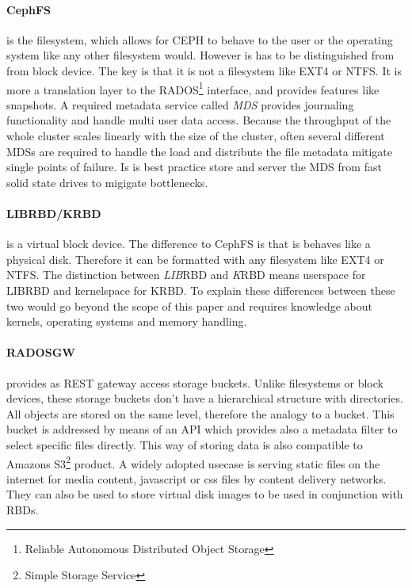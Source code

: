 \documentclass[titlepage, a4paper, 11pt]{scrartcl}
\begin{document}
                \paragraph{CephFS} is the filesystem, which allows for CEPH to behave to the user or the operating system like any other
                filesystem would. However is has to be distinguished from from block device. 
                The key is that it is not a filesystem like EXT4 or NTFS. It is more a translation layer to the
                RADOS\footnote{Reliable Autonomous Distributed Object Storage} interface, and provides features like snapshots. A required metadata service called \textit{MDS} provides journaling functionality and handle
                multi user data access. Because the throughput of the whole cluster scales linearly with the size of the cluster,
                often several different MDSs are required to handle the load and distribute the file metadata mitigate
                single points of failure. Is is best practice store and server the MDS from fast solid state drives to migigate bottlenecks.

                \paragraph{LIBRBD/KRBD} is a virtual block device. The difference to CephFS is that is behaves like a physical disk.
                Therefore it can be formatted with any filesystem like EXT4 or NTFS. The distinction between \textit{LIB}RBD and \textit{K}RBD
                means userspace for LIBRBD and kernelspace for KRBD. To explain these differences between these two would go beyond the 
                scope of this paper and requires knowledge about kernels, operating systems and memory handling. 

                \paragraph{RADOSGW} provides as REST gateway access storage buckets. Unlike filesystems or block devices, these storage
                buckets don't have a hierarchical structure with directories. All objects are stored on the same level, therefore the 
                analogy to a bucket. This bucket is addressed by means of an API which provides also a metadata filter to select
                specific files directly. This way of storing data is also compatible to Amazons S3\footnote{Simple Storage Service} product.
                A widely adopted usecase is serving static files on the internet for media content, javascript or css files by content delivery networks.
                They can also be used to store virtual disk images to be used in conjunction with RBDs.
\end{document}
